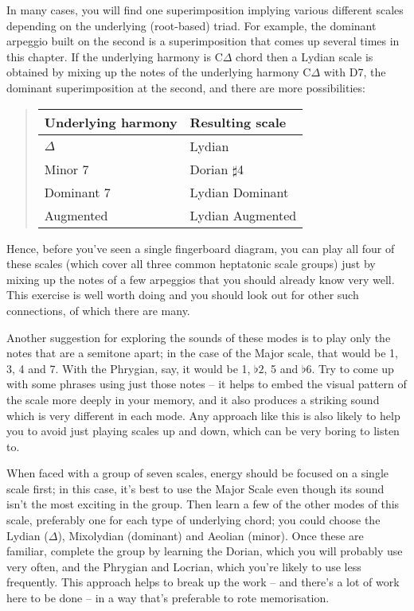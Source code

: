 \documentclass[english]{./gbook}
\begin{document}
\begin{large}
In many cases, you will find one superimposition implying various different scales depending on the underlying (root-based) triad. For example, the dominant arpeggio built on the second is a superimposition that comes up several times in this chapter. If the underlying harmony is C$\Delta$ chord then a Lydian scale is obtained by mixing up the notes of the underlying harmony C$\Delta$ with D7, the dominant superimposition at the second, and there are more possibilities:
\begin{quote}
	\begin{tabular}{l|l}
		Underlying harmony & Resulting scale \\
		\hline $\Delta$ & Lydian \\
		Minor 7 & Dorian $\sharp$4 \\
		Dominant 7 & Lydian Dominant \\
		Augmented & Lydian Augmented
	\end{tabular}
\end{quote}
Hence, before you've seen a single fingerboard diagram, you can play all four of these scales (which cover all three common heptatonic scale groups) just by mixing up the notes of a few arpeggios that you should already know very well. This exercise is well worth doing and you should look out for other such connections, of which there are many.

Another suggestion for exploring the sounds of these modes is to play only the notes that are a semitone apart; in the case of the Major scale, that would be 1, 3, 4 and 7. With the Phrygian, say, it would be 1, $\flat 2$, 5 and $\flat 6$. Try to come up with some phrases using just those notes -- it helps to embed the visual pattern of the scale more deeply in your memory, and it also produces a striking sound which is very different in each mode. Any approach like this is also likely to help you to avoid just playing scales up and down, which can be very boring to listen to.

When faced with a group of seven scales, energy should be focused on a single scale first; in this case, it's best to use the Major Scale even though its sound isn't the most exciting in the group. Then learn a few of the other modes of this scale, preferably one for each type of underlying chord; you could choose the Lydian ($\Delta$), Mixolydian (dominant) and Aeolian (minor). Once these are familiar, complete the group by learning the Dorian, which you will probably use very often, and the Phrygian and Locrian, which you're likely to use less frequently. This approach helps to break up the work -- and there's a lot of work here to be done -- in a way that's preferable to rote memorisation.


\end{large}
\end{document}
